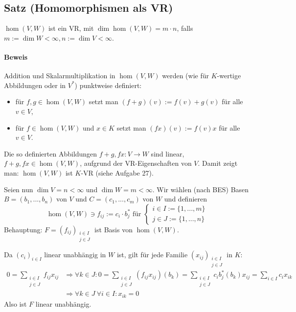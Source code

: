  \subsection{Satz (Homomorphismen als VR)}
 	\begin{Satz}
 		$ \hom (V,W) $ ist ein VR, mit $\dim\hom (V,W) = m\cdot n$, falls $m:=\dim W<\infty, n:=\dim V< \infty$.
 	\end{Satz}
 	\paragraph{Beweis}
 		Addition und Skalarmultiplikation in $\hom (V,W)$ werden (wie für $K$-wertige Abbildungen oder in $V^*$) punktweise definiert:
 		\begin{itemize}
 			\item für $f,g \in \hom (V,W)$ setzt man $(f+g)(v) := f(v) + g(v)$ für alle $v\in V$,
 			\item für $f\in \hom (V,W)$ und $x\in K$ setzt man $(fx)(v) := f(v)x$ für alle $v\in V$.
 		\end{itemize}
 		Die so definierten Abbildungen $f+g,fx: V\to W$ sind linear, $f+g, fx\in \hom (V,W)$, aufgrund der VR-Eigenschaften von $V$. Damit zeigt man: $\hom (V,W)$ ist $K$-VR (siehe Aufgabe 27).

 		Seien nun $\dim V = n < \infty$ und $\dim W = m < \infty$.
 		Wir wählen (nach BES) Basen $B = (b_1,...,b_n)$ von $V$ und $C=(c_1,...,c_m)$ von $W$ und definieren
 		\begin{equation*}
 			\hom (V,W) \ni f_{ij}:= c_i\cdot b_j^* \text{ für }
 			\begin{cases}
 				i\in I := \{1,...,m\} \\
 				j\in J := \{1,...,n\}
 			\end{cases}
 		\end{equation*}
 		Behauptung: $F=(f_{ij})_{\substack{i\in I\\j \in J}}$ ist Basis von $\hom (V,W)$.

 		Da $(c_i)_{i\in I}$ linear unabhängig in $W$ ist, gilt für jede Familie $(x_{ij})_{\substack{i\in I\\j \in J}}$ in $K$:
 		\begin{align*}
 			0 = \sum_{\substack{i\in I \\j \in J}} f_{ij}x_{ij} &\Rightarrow \forall k \in J: 0 = \sum_{\substack{i\in I\\j \in J}} (f_{ij}x_{ij})(b_k) = \sum_{\substack{i\in I\\j \in J}} c_i b_j^* (b_k) x_{ij} = \sum_{i\in I} c_ix_{ik} \\
                                                                            & \Rightarrow \forall k\in J\ \forall i\in I:x_{ik} = 0
 		\end{align*}
 		Also ist $F$ linear unabhängig.

